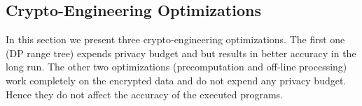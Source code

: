 \begin{comment}
For answering queries of the form $\phi=A_1==v_1\wedge \ldots  \wedge A_n==v_n$, ideally we just need to compute for $A_2==v_2\wedge \ldots \wedge A_n==v_n$ on $ct_{A,v}$ number of records starting from position $\sum_{i=1}^{i=v-1}ct_{A,i}$ of $\boldsymbol{\mathcal{\tilde{D}}}_{sort}$. 

However the \textsf{AS} has access only to the noisy CDF over the $k$ bins $ct_{A,i}$. Note that when $\bar{i}_{start}=\bar{\hat{\mathcal{C}}}[v-1] < \sum_{i=1}^{i=v-1}ct_{A,i}$ and $\bar{i}_{end}= \bar{\hat{\mathcal{C}}}[v-1] > i_{start}+ct_{A,v}$, i.e., the indices computed from the noisy values  saddle over the true records satisfying $A==v$, then although we end up loosing in performance a bit, we are still guaranteed to compute the exact non-noisy count for records satisfying $\phi$. 

In all other cases, we end up disregarding some of the records that satisfy $A==v$, some of these rejected records in fact might additionally satisfy $A_1==v_1 \wedge \ldots \wedge A_n==v_n$. Thus we might get inaccurate answer for query predicate $\phi$ (note that here we are talking about the encrypted true count of the given query predicate that is computed by the AS via a series of transformations before applying the LaplaceMechanism primitive).  An effective heuristic to tackle this can be to compensate for the expected laplacian error as follows  $\bar{i}_{start}= \bar{\hat{\mathcal{C}}}[v-1]-\frac{2}{\epsilon}$ and $\bar{i}_{end}=\bar{\hat{\mathcal{C}}}[v]+\frac{2}{\epsilon}$. Also note that answering differentially private  range queries   on attribute $A$ can also be directly done from the noisy CDF $\bar{\hat{\mathcal{C}}}$ 
\end{comment}



 


\subsection{Crypto-Engineering Optimizations} \label{sec:im_optimization}
In this section we present three crypto-engineering optimizations. The first one (DP range tree) expends privacy budget and but results in better accuracy in the long run. The other two optimizations (precomputation and off-line processing) work completely on the encrypted data and do not expend any privacy budget. Hence they do not affect the accuracy of the executed programs.


